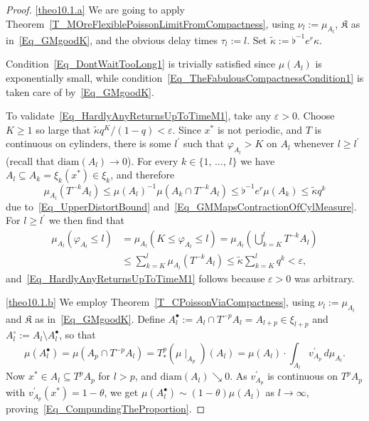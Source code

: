 \documentclass[AHL,Unicode,longabstracts]{cedram}
\newcommand{\diam}{\mathrm{diam}}
\newcommand{\frkK}{\mathfrak{K}}
\begin{document}
\begin{proof}\leavevmode

\noindent\eqref{theo10.1.a} We are going to apply Theorem~\ref{T_MOreFlexiblePoissonLimitFromCompactness}, using $\nu_{l}:=\mu_{A_{l}}$, $\frkK$ as in~\eqref{Eq_GMgoodK}, and the obvious delay times $\tau _{l}:=l$. Set $\widetilde{\kappa}:=\flat^{-1}e^{r}\kappa$.

Condition~\eqref{Eq_DontWaitTooLong1} is trivially satisfied since $\mu (A_{l})$ is exponentially small, while condition~\eqref{Eq_TheFabulousCompactnessCondition1} is taken care of by~\eqref{Eq_GMgoodK}.

To validate~\eqref{Eq_HardlyAnyReturnsUpToTimeM1}, take any $\varepsilon>0$. Choose $K\geq1$ so large that $\widetilde{\kappa}q^{K}/(1-q)<\varepsilon$. Since $x^{\ast}$ is not periodic, and $T$ is continuous on cylinders, there is some $l^{\prime}$ such that $\varphi_{A_{l}}>K$ on $A_{l}$ whenever $l\geq l^{\prime}$ (recall that $\diam(A_{l})\rightarrow0$). For every $k\in\{1,\,\ldots,\,l\}$ we have $A_{l}\subseteq A_{k}=\xi_{k}(x^{\ast})\in\xi _{k}$, and therefore
\begin{equation}
\mu_{A_{l}}\left(T^{-k}A_{l}\right)\leq\mu(A_{l})^{-1}\mu\left(A_{k}\cap T^{-k}A_{l}\right)\leq
\flat^{-1}e^{r}\mu(A_{k})\leq\widetilde{\kappa}q^{k}
\end{equation}
due to~\eqref{Eq_UpperDistortBound} and~\eqref{Eq_GMMapsContractionOfCylMeasure}. For $l\geq l^{\prime}$ we then find that
\begin{equation}
\begin{split}
\mu_{A_{l}}\left(\varphi_{A_{l}}\leq l\right) & =\mu_{A_{l}}\left(K\leq\varphi_{A_{l}}\leq l\right) =\mu_{A_{l}}\left(\bigcup\nolimits_{k=K}^{l} T^{-k}A_{l}\right)\\
& \leq \sum\nolimits_{k=K}^{l}
\mu_{A_{l}}\left(T^{-k}A_{l}\right) \leq\widetilde{\kappa} \sum\nolimits_{k=K}^{l} q^{k}<\varepsilon,
\end{split}
\end{equation}
and~\eqref{Eq_HardlyAnyReturnsUpToTimeM1} follows because $\varepsilon>0$ was arbitrary.


\noindent\eqref{theo10.1.b} We employ Theorem~\ref{T_CPoissonViaCompactness}, using $\nu _{l}:=\mu_{A_{l}}$ and $\frkK$ as in~\eqref{Eq_GMgoodK}. Define $A_{l}^{\bullet}:=A_{l}\cap T^{-p}A_{l}=A_{l+p}\in\xi_{l+p}$ and $A_{l} ^{\circ}:=A_{l}\setminus A_{l}^{\bullet}$, so that
\[
\mu\left(A_{l}^{\bullet}\right)=\mu\left(A_{p}\cap T^{-p}A_{l}\right)=T_{\ast}^{p}\left(\mu\mid_{A_{p} }\right)(A_{l})=\mu(A_{l})\cdot {\textstyle\int\nolimits_{A_{l}}} v_{A_{p}}^{\prime}\,d\mu_{A_{l}}.
\]
Now $x^{\ast}\in A_{l}\subseteq T^{p}A_{p}$ for $l>p$, and $\diam (A_{l})\searrow0$. As $v_{A_{p}}^{\prime}$ is continuous on $T^{p}A_{p}$ with $v_{A_{p}}^{\prime}(x^{\ast})=1-\theta$, we get $\mu(A_{l}^{\bullet})\sim(1-\theta)\mu(A_{l})$ as $l\rightarrow\infty$, proving~\eqref{Eq_CompundingTheProportion}.


\end{proof}
\end{document}
